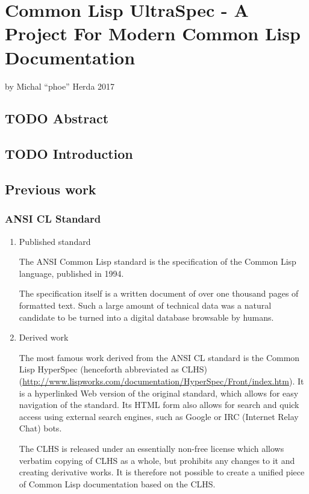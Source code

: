 \section{Common Lisp UltraSpec - A Project For Modern Common Lisp
Documentation}\label{common-lisp-ultraspec---a-project-for-modern-common-lisp-documentation}

by Michal ``phoe'' Herda 2017

\subsection{TODO Abstract}\label{todo-abstract}

\subsection{TODO Introduction}\label{todo-introduction}

\subsection{Previous work}\label{previous-work}

\subsubsection{ANSI CL Standard}\label{ansi-cl-standard}

\begin{enumerate}
\item
  Published standard

  The ANSI Common Lisp standard is the specification of the Common Lisp
  language, published in 1994.

  The specification itself is a written document of over one thousand
  pages of formatted text. Such a large amount of technical data was a
  natural candidate to be turned into a digital database browsable by
  humans.
\item
  Derived work

  The most famous work derived from the ANSI CL standard is the Common
  Lisp HyperSpec (henceforth abbreviated as CLHS)
  (\url{http://www.lispworks.com/documentation/HyperSpec/Front/index.htm}).
  It is a hyperlinked Web version of the original standard, which allows
  for easy navigation of the standard. Its HTML form also allows for
  search and quick access using external search engines, such as Google
  or IRC (Internet Relay Chat) bots.

  The CLHS is released under an essentially non-free license which
  allows verbatim copying of CLHS as a whole, but prohibits any changes
  to it and creating derivative works. It is therefore not possible to
  create a unified piece of Common Lisp documentation based on the CLHS.
\end{enumerate}

